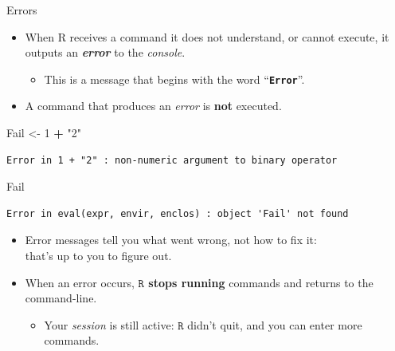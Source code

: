 \documentclass[
  11pt,
  ignorenonframetext,
]{beamer}
\newenvironment{Shaded}{\begin{snugshade}}{\end{snugshade}}
\newcommand{\DecValTok}[1]{\textcolor[rgb]{0.00,0.00,0.81}{#1}}
\newcommand{\ErrorTok}[1]{\textcolor[rgb]{0.64,0.00,0.00}{\textbf{#1}}}
\newcommand{\NormalTok}[1]{#1}
\newcommand{\OtherTok}[1]{\textcolor[rgb]{0.56,0.35,0.01}{#1}}
\newcommand{\SpecialCharTok}[1]{\textcolor[rgb]{0.81,0.36,0.00}{\textbf{#1}}}
\newcommand{\StringTok}[1]{\textcolor[rgb]{0.31,0.60,0.02}{#1}}
\providecommand{\tightlist}{%
  \setlength{\itemsep}{0pt}\setlength{\parskip}{0pt}}
\begin{document}
\begin{frame}[fragile]{Errors}
\protect\hypertarget{errors}{}
\begin{itemize}
\tightlist
\item
  When R receives a command it does not understand, or cannot execute,
  it outputs an \textbf{\emph{error}} to the \emph{console}.

  \begin{itemize}
  \tightlist
  \item
    This is a message that begins with the word
    ``\ErrorTok{\texttt{Error}}''.
  \end{itemize}
\item
  A command that produces an \emph{error} is \textbf{not} executed.
\end{itemize}

\begin{Shaded}
\begin{Highlighting}[]
\NormalTok{Fail }\OtherTok{\textless{}{-}} \DecValTok{1} \SpecialCharTok{+} \StringTok{"2"}
\end{Highlighting}
\end{Shaded}

\begin{verbatim}
Error in 1 + "2" : non-numeric argument to binary operator
\end{verbatim}

\begin{Shaded}
\begin{Highlighting}[]
\NormalTok{Fail}
\end{Highlighting}
\end{Shaded}

\begin{verbatim}
Error in eval(expr, envir, enclos) : object 'Fail' not found
\end{verbatim}

\begin{itemize}
\tightlist
\item
  Error messages tell you what went wrong, not how to fix it:\\
  that's up to you to figure out.
\item
  When an error occurs, \textbf{\(\texttt{R}\) stops running} commands
  and returns to the command-line.

  \begin{itemize}
  \tightlist
  \item
    Your \emph{session} is still active: \(\texttt{R}\) didn't quit, and
    you can enter more commands.
  \end{itemize}
\end{itemize}
\end{frame}
\end{document}
